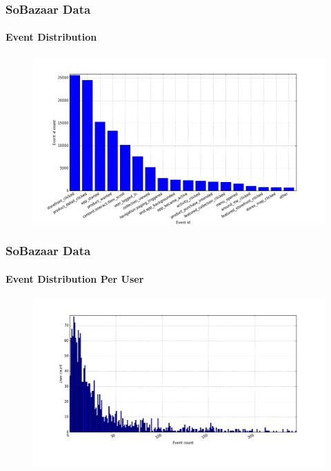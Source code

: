 \documentclass{beamer}
\begin{document}
  \begin{frame}
    \frametitle{SoBazaar Data}
    \framesubtitle{Event Distribution}
    \begin{figure}[H]
        \includegraphics[scale=0.3]{../src/image/event_iddistribution.png}
        \centering
    \end{figure}
  \end{frame}

  \begin{frame}
    \frametitle{SoBazaar Data}
    \framesubtitle{Event Distribution Per User}
    \begin{figure}[H]
        \includegraphics[scale=0.3]{../src/image/user_iddistribution.png}
        \centering
    \end{figure}
  \end{frame}
\end{document}
